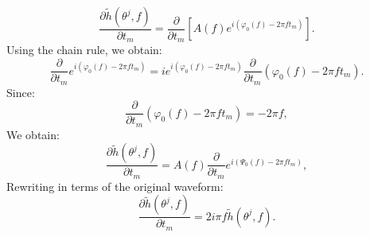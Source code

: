 \documentclass[a4paper,12pt]{article}
\begin{document}
\begin{equation}
\frac{\partial \tilde{h}(\theta^{j},f)}{\partial t_m} = \frac{\partial}{\partial t_m} \left[ A(f) e^{i (\varphi_0(f) - 2\pi f t_m)} \right].
\end{equation}
Using the chain rule, we obtain:
\begin{equation}
\frac{\partial}{\partial t_m} e^{i (\varphi_0(f) - 2\pi f t_m)} = i e^{i (\varphi_0(f) - 2\pi f t_m)} \frac{\partial}{\partial t_m} (\varphi_0(f) - 2\pi f t_m).
\end{equation}
Since:
\begin{equation}
\frac{\partial}{\partial t_m} \left(\varphi_0(f) - 2\pi f t_m\right) = -2\pi f,
\end{equation}
We obtain:
\begin{equation}    
\frac{\partial \tilde{h}(\theta^{j},f)}{\partial t_m} = A(f) \frac{\partial}{\partial t_m} e^{i (\Psi_0(f) - 2\pi f t_m)},
\end{equation}
Rewriting in terms of the original waveform:
\begin{equation}
\frac{\partial \tilde{h}(\theta^{j},f)}{\partial t_m} = 2i \pi f \tilde{h}(\theta^{j},f).
\end{equation}



\end{document}
